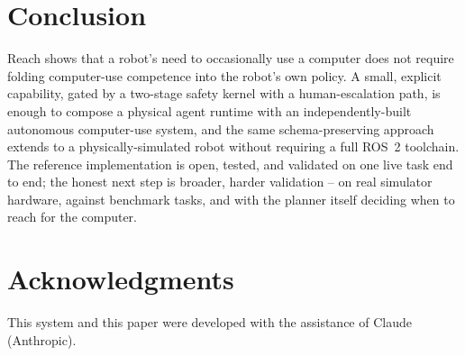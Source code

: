 \documentclass{article}
\begin{document}
\section{Conclusion}
Reach shows that a robot's need to occasionally use a computer does not
require folding computer-use competence into the robot's own policy. A
small, explicit capability, gated by a two-stage safety kernel with a
human-escalation path, is enough to compose a physical agent runtime with
an independently-built autonomous computer-use system, and the same
schema-preserving approach extends to a physically-simulated robot without
requiring a full ROS~2 toolchain. The reference implementation is open,
tested, and validated on one live task end to end; the honest next step is
broader, harder validation -- on real simulator hardware, against
benchmark tasks, and with the planner itself deciding when to reach for
the computer.

\section*{Acknowledgments}
This system and this paper were developed with the assistance of Claude
(Anthropic).
\end{document}

